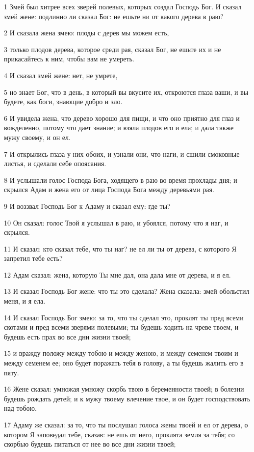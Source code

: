 \par 1 Змей был хитрее всех зверей полевых, которых создал Господь Бог. И сказал змей жене: подлинно ли сказал Бог: не ешьте ни от какого дерева в раю?
\par 2 И сказала жена змею: плоды с дерев мы можем есть,
\par 3 только плодов дерева, которое среди рая, сказал Бог, не ешьте их и не прикасайтесь к ним, чтобы вам не умереть.
\par 4 И сказал змей жене: нет, не умрете,
\par 5 но знает Бог, что в день, в который вы вкусите их, откроются глаза ваши, и вы будете, как боги, знающие добро и зло.
\par 6 И увидела жена, что дерево хорошо для пищи, и что оно приятно для глаз и вожделенно, потому что дает знание; и взяла плодов его и ела; и дала также мужу своему, и он ел.
\par 7 И открылись глаза у них обоих, и узнали они, что наги, и сшили смоковные листья, и сделали себе опоясания.
\par 8 И услышали голос Господа Бога, ходящего в раю во время прохлады дня; и скрылся Адам и жена его от лица Господа Бога между деревьями рая.
\par 9 И воззвал Господь Бог к Адаму и сказал ему: где ты?
\par 10 Он сказал: голос Твой я услышал в раю, и убоялся, потому что я наг, и скрылся.
\par 11 И сказал: кто сказал тебе, что ты наг? не ел ли ты от дерева, с которого Я запретил тебе есть?
\par 12 Адам сказал: жена, которую Ты мне дал, она дала мне от дерева, и я ел.
\par 13 И сказал Господь Бог жене: что ты это сделала? Жена сказала: змей обольстил меня, и я ела.
\par 14 И сказал Господь Бог змею: за то, что ты сделал это, проклят ты пред всеми скотами и пред всеми зверями полевыми; ты будешь ходить на чреве твоем, и будешь есть прах во все дни жизни твоей;
\par 15 и вражду положу между тобою и между женою, и между семенем твоим и между семенем ее; оно будет поражать тебя в голову, а ты будешь жалить его в пяту.
\par 16 Жене сказал: умножая умножу скорбь твою в беременности твоей; в болезни будешь рождать детей; и к мужу твоему влечение твое, и он будет господствовать над тобою.
\par 17 Адаму же сказал: за то, что ты послушал голоса жены твоей и ел от дерева, о котором Я заповедал тебе, сказав: не ешь от него, проклята земля за тебя; со скорбью будешь питаться от нее во все дни жизни твоей;
